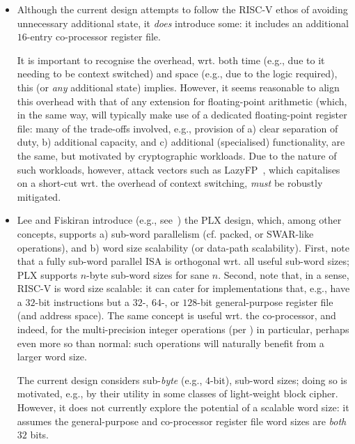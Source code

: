 \begin{itemize}
\item Although the current design attempts to follow the RISC-V ethos of 
      avoiding unnecessary additional state, it {\em does} introduce some:
      it includes an additional $16$-entry co-processor register file.  

      It is important to recognise 
      the overhead, wrt. both 
      time (e.g., due to it needing to be context switched) 
      and 
      space (e.g., due to the logic required),
      this (or {\em any} additional state) implies.
      However, it seems reasonable to align this overhead with that of any
      extension for floating-point arithmetic (which, in the same way, will
      typically make use of a dedicated floating-point register file: many 
      of the trade-offs involved, e.g., provision of
      a) clear separation of duty,
      b) additional capacity,
         and
      c) additional (specialised) functionality,
      are the same, but motivated by cryptographic workloads.
      Due to the nature of such workloads, however, attack vectors such as
      LazyFP~\cite{SCARV:StePre:18}, which capitalises on a short-cut wrt. 
      the overhead of context switching, {\em must} be robustly mitigated.

\item Lee and Fiskiran introduce (e.g., see~\cite{SCARV:LeeFis:05}) the PLX
      design, which, among other concepts, supports 
      a) sub-word parallelism (cf. packed, or SWAR-like operations),
         and
      b) word size scalability (or data-path scalability).
      First, 
      note that a fully sub-word parallel ISA is orthogonal wrt. all useful
      sub-word sizes; PLX supports $n$-byte sub-word sizes for sane $n$.
      Second,
      note that, in a sense, RISC-V is word size scalable: it can cater for
      implementations that, e.g., have a $32$-bit instructions but a $32$-,
      $64$-, or $128$-bit general-purpose register file (and address space).
      The same concept is useful wrt. the co-processor, and indeed, for the
      multi-precision integer operations (per )
      in particular, perhaps even more so than normal: such operations will
      naturally benefit from a larger word size.

      The current design considers sub-{\em byte} (e.g., $4$-bit), sub-word
      sizes; doing so is motivated, e.g., by their utility in some classes 
      of light-weight block cipher.  However, it does not currently explore 
      the potential of a scalable word size: it assumes the general-purpose
      and co-processor register file word sizes are {\em both} $32$ bits.


\end{itemize}
